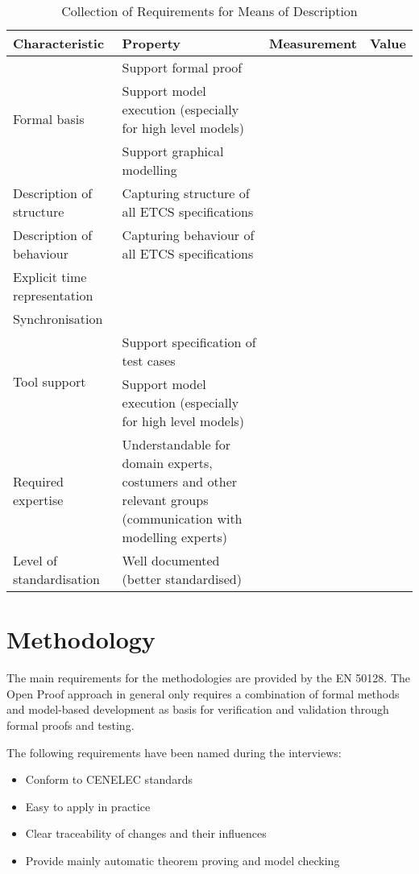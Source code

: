 \begin{table}[htp]

\caption{Collection of Requirements for Means of Description}
\label{tab:reqMoD}



\begin{tabular}{|m{4cm}|m{5.5cm}|m{2.5cm}|m{1cm}|}
\hline
\textbf{Characteristic} & \textbf{Property} & \textbf{Measurement} & \textbf{Value} \\ \hline
\multirow{3}{*}{Formal basis} &  Support formal proof & & \\ \cline{2-4}
				& Support model execution (especially for high level models) & &  \\ \hline
\multirow{1}{*}{Representation} & Support graphical modelling & & \\ \hline
\multirow{1}{*}{Description of structure} &  Capturing structure of all ETCS specifications & & \\ \hline
\multirow{1}{*}{Description of behaviour} &  Capturing behaviour of all ETCS specifications& &  \\ \hline
\multirow{1}{*}{Explicit time representation} & & & \\ \hline
\multirow{1}{*}{Synchronisation} &  & & \\ \hline
\multirow{2}{*}{Tool support} & Support specification of test cases & & \\ \cline{2-4}
				& Support model execution (especially for high level models)& &  \\ \hline
\multirow{1}{*}{Required expertise} & Understandable for domain experts, costumers and other relevant groups (communication with modelling experts) & & \\ \hline
\multirow{1}{*}{Level of standardisation} & Well documented (better standardised) & & \\ \hline
\end{tabular}
\end{table}


\section{Methodology}

The main requirements for the methodologies are provided by the EN 50128. The Open Proof approach in general only requires a combination of formal methods and model-based development as basis for verification and validation through formal proofs and testing.

The following requirements have been named during the interviews:
\vspace{-10pt}
\begin{itemize}
\item Conform to CENELEC standards
\item Easy to apply in practice
\item Clear traceability of changes and their influences
\item Provide mainly automatic theorem proving and model checking
\end{itemize}

